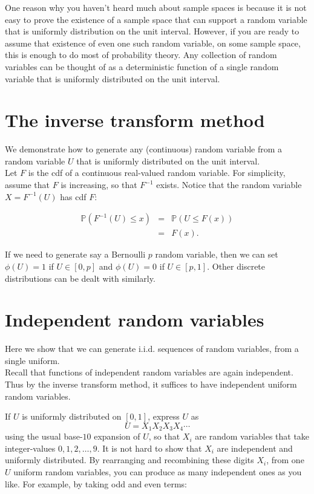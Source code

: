 \documentclass[
]{article}
\theoremstyle{definition}
\theoremstyle{definition}
\theoremstyle{definition}
\theoremstyle{definition}
\theoremstyle{remark}
\begin{document}
One reason why you haven't heard much about sample spaces is because it is not easy to prove the existence of a sample space that can support a random variable that is uniformly distribution on the unit interval. However, if you are ready to assume that existence of even one such random variable, on some sample space, this is enough to do most of probability theory. Any collection of random variables can be thought of as a deterministic function of a single random variable that is uniformly distributed on the unit interval.

\hypertarget{the-inverse-transform-method}{%
\section{The inverse transform method}\label{the-inverse-transform-method}}

We demonstrate how to generate any (continuous) random variable from a random variable \(U\) that is uniformly distributed on the unit interval.\\
Let \(F\) is the cdf of a continuous real-valued random variable. For simplicity, assume that \(F\) is increasing, so that \(F^{-1}\) exists.
Notice that the random variable \(X=F^{-1}(U)\) has cdf \(F\):

\begin{eqnarray*}
\mathbb{P}( F^{-1}(U) \leq x) &=&  \mathbb{P}(U \leq F(x)) \\
&=&  F(x).
\end{eqnarray*}

If we need to generate say a Bernoulli \(p\) random variable, then we can set \(\phi(U) = 1\) if \(U \in [0,p]\) and \(\phi(U)=0\) if \(U \in [p, 1]\). Other discrete distributions can be dealt with similarly.

\hypertarget{independent-random-variables}{%
\section{Independent random variables}\label{independent-random-variables}}

Here we show that we can generate i.i.d. sequences of random variables, from a single uniform.\\
Recall that functions of independent random variables are again independent. Thus by the inverse transform method, it suffices to have independent uniform random variables.

If \(U\) is uniformly distributed on \([0,1]\), express \(U\) as
\[ U= X_1 X_2 X_3 X_4 \cdots\]
using the usual base-\(10\) expansion of \(U\), so that \(X_i\) are random variables that take integer-values \(0,1,2, \ldots, 9\). It is not hard to show that \(X_i\) are independent and uniformly distributed. By rearranging and recombining these digits \(X_i\), from one \(U\) uniform random variables, you can produce as many independent ones as you like. For example, by taking odd and even terms:
\end{document}
